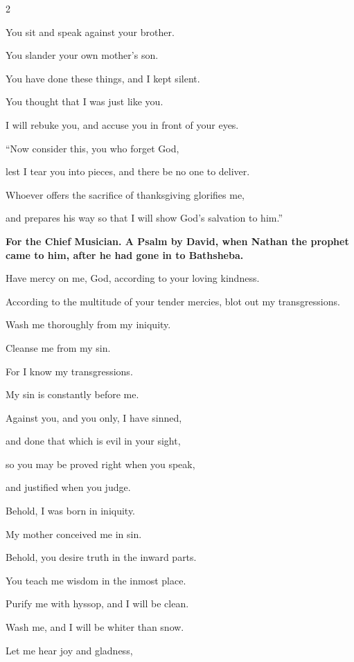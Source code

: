 \begin{multicols}{2}
	
	\myverse{}You sit and speak against your brother.
	
	You slander your own mother’s son.
	
	
	\myverse{}You have done these things, and I kept silent.
	
	You thought that I was just like you.
	
	I will rebuke you, and accuse you in front of your eyes.
	
	\vspace{\baselineskip}
	
	\myverse{}“Now consider this, you who forget God,
	
	lest I tear you into pieces, and there be no one to deliver.
	
	
	\myverse{}Whoever offers the sacrifice of thanksgiving glorifies me,
	
	and prepares his way so that I will show God’s salvation to him.”
	
	
	\mychapter{}\textbf{For the Chief Musician. A Psalm by David, when Nathan the prophet came to him, after he had
		gone in to Bathsheba.}
	
	\myverse*{}Have mercy on me, God, according to your loving kindness.
	
	According to the multitude of your tender mercies, blot out my transgressions.
	
	
	\myverse{}Wash me thoroughly from my iniquity.
	
	Cleanse me from my sin.
	
	
	\myverse{}For I know my transgressions.
	
	My sin is constantly before me.
	
	
	\myverse{}Against you, and you only, I have sinned,
	
	and done that which is evil in your sight,
	
	so you may be proved right when you speak,
	
	and justified when you judge.
	
	
	\myverse{}Behold, I was born in iniquity.
	
	My mother conceived me in sin.
	
	
	\myverse{}Behold, you desire truth in the inward parts.
	
	You teach me wisdom in the inmost place.
	
	
	\myverse{}Purify me with hyssop, and I will be clean.
	
	Wash me, and I will be whiter than snow.
	
	
	\myverse{}Let me hear joy and gladness,
	

\end{multicols}
